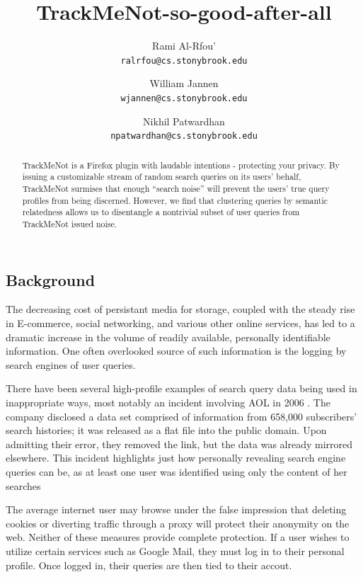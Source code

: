 \documentclass[11pt]{article}
\title{TrackMeNot-so-good-after-all}
\author{Rami Al-Rfou' \\{\texttt{ralrfou@cs.stonybrook.edu}}
\and William Jannen \\{\texttt{wjannen@cs.stonybrook.edu}}
\and Nikhil Patwardhan \\{\texttt{npatwardhan@cs.stonybrook.edu}}
}
\begin{document}
\maketitle

\pagestyle{headings}

\begin{abstract}
  TrackMeNot is a Firefox plugin with laudable intentions - protecting
  your privacy. By issuing a customizable stream of random search
  queries on its users' behalf, TrackMeNot surmises that enough ``search
  noise'' will prevent the users' true query profiles from being
  discerned. However, we find that clustering queries by semantic
  relatedness allows us to disentangle a nontrivial subset of user
  queries from TrackMeNot issued noise.
\end{abstract}
\begin{multicols}{2}
\section{Background}
\label{sec:background}

The decreasing cost of persistant media for storage, coupled with the
steady rise in E-commerce, social networking, and various other online
services, has led to a dramatic increase in the volume of readily
available, personally identifiable information. One often overlooked
source of such information is the logging by search engines of user
queries.

There have been several high-profile examples of search query data
being used in inappropriate ways, most notably an incident involving AOL in 2006 \cite{aol}. The company disclosed a data set comprised of  information from 658,000
subscribers' search histories; it was released as a flat file into the public
domain. Upon admitting their error, they removed the link, but the data was already mirrored elsewhere. This incident highlights just how personally revealing search
engine queries can be, as at least one user was identified using only
the content of her searches %

The average internet user may browse under the false impression that
deleting cookies or diverting traffic through a proxy will protect
their anonymity on the web. Neither of these measures provide complete
protection. If a user wishes to utilize certain services such as
Google Mail, they must log in to their personal profile. Once logged
in, their queries are then tied to their accout.


\end{multicols}
\end{document}
